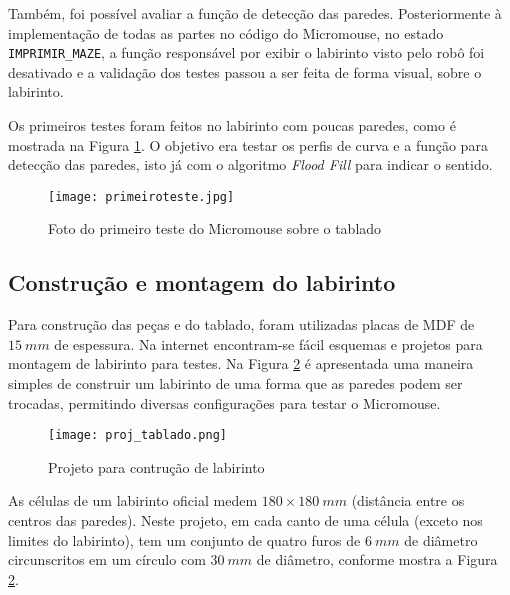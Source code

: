 Também, foi possível avaliar a função de detecção das paredes. Posteriormente à implementação de todas as partes no código do Micromouse, no estado \verb+IMPRIMIR_MAZE+, a função responsável por exibir o labirinto visto pelo robô foi desativado e a validação dos testes passou a ser feita de forma visual, sobre o labirinto.

Os primeiros testes foram feitos no labirinto com poucas paredes, como é mostrada na Figura \ref{fig:labteste}. O objetivo era testar os perfis de curva e a função para detecção das paredes, isto já com o algoritmo \emph{Flood Fill} para indicar o sentido.

\begin{figure}[!htb]
	\caption{\label{fig:labteste}Foto do primeiro teste do Micromouse sobre o tablado}
	\begin{center}
		\texttt{[image: primeiroteste.jpg]}
	\end{center}
\end{figure}


\subsection{Construção e montagem do labirinto}

Para construção das peças e do tablado, foram utilizadas placas de MDF de $15~mm$ de espessura. Na internet encontram-se fácil esquemas e projetos para montagem de labirinto para testes. Na Figura \ref{fig:proj_labirinto} é apresentada uma maneira simples de construir um labirinto de uma forma que as paredes podem ser trocadas, permitindo diversas configurações para testar o Micromouse. 
 
\begin{figure}[!htb]
	\caption{\label{fig:proj_labirinto}Projeto para contrução de labirinto}
	\begin{center}
		\texttt{[image: proj\_tablado.png]}
	\end{center}
\end{figure}

As células de um labirinto oficial medem $180\times180~mm$ (distância entre os centros das paredes). Neste projeto, em cada canto de uma célula (exceto nos limites do labirinto), tem um conjunto de quatro furos de $6~mm$ de diâmetro circunscritos em um círculo com $30~mm$ de diâmetro, conforme mostra a Figura \ref{fig:proj_labirinto}.

